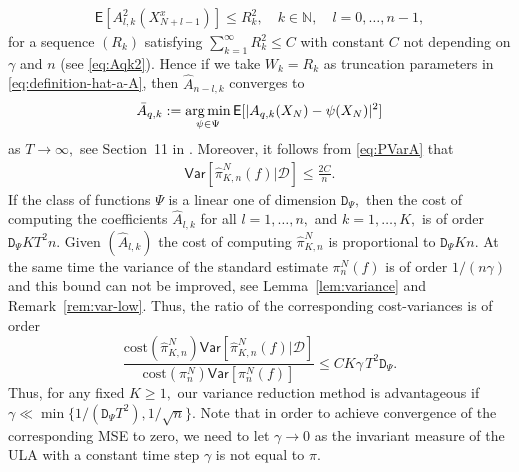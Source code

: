 \documentclass[bj]{imsart}
\def\PE{\mathsf{E}}
\def\PVar{\mathsf{Var}}
\def\nset{\mathbb{N}}
\def\TrainSet{\mathcal{D}}
\newcommand*{\argmin}{\operatornamewithlimits{arg\,min}}
\begin{document}
\begin{eqnarray*}
\PE[A^2_{l,k}(X^x_{N+l-1})]\leq R^2_k ,\quad k \in \nset, \quad l=0,\ldots,n-1,
\end{eqnarray*}
for a sequence  $(R_k)$ satisfying $\sum_{k=1}^\infty R^2_k\leq C$ with constant $C$  not depending  on $\gamma$ and $n$ (see \eqref{eq:Aqk2}).  Hence if we take $W_k=R_k$ as truncation parameters in \eqref{eq:definition-hat-a-A}, then $\widehat A_{n-l,k}$ converges to
\[
\bar A_{q,k}:=\argmin_{\psi\in\Psi}\mathsf{E}[|A_{q,k}(X_{N})-\psi(X_{N})|^2]
\]
 as $T\to \infty,$ see Section~11 in \cite{gyorfi2006distribution}.  Moreover, it follows from \eqref{eq:PVarA} that
\begin{eqnarray*}
\PVar[\widehat \pi_{K,n}^N(f)|\TrainSet]\leq \frac{2C}{n}.
\end{eqnarray*}
If the class of functions $\Psi$ is a linear one of dimension $\mathtt{D}_\Psi,$ then the cost of computing the coefficients $\widehat A_{l,k}$ for all $l=1,\ldots,n,$ and $k=1,\ldots,K,$ is of order  $ \mathtt{D}_\Psi K T^2 n$. Given $(\widehat A_{l,k})$ the cost of computing  $\widehat \pi_{K,n}^N$ is proportional to $\mathtt{D}_\Psi K n.$ At the same time the variance of the standard estimate $ \pi_{n}^N(f)$ is of order $1/(n\gamma)$ and this bound can not be improved, see Lemma~\ref{lem:variance} and Remark~\ref{rem:var-low}. Thus, the ratio of the corresponding cost-variances is of order
\begin{equation}
\label{eq:cost_theoretical}
\frac{\mathrm{cost}(\widehat \pi_{K,n}^N) \PVar[\widehat \pi_{K,n}^N(f)|\TrainSet]}{\mathrm{cost}(\pi_{n}^N)\PVar[\pi_{n}^N(f)]}\leq C  K \gamma \, T^2 \mathtt{D}_\Psi.
\end{equation}
Thus, for any fixed $K\geq 1,$  our variance reduction method is advantageous if $\gamma\ll\min\{1/(\mathtt{D}_\Psi T^2),1/\sqrt{n}\}.$  Note that in order to achieve convergence of the corresponding MSE to zero, we need to let $\gamma\to 0$ as the invariant measure of the ULA with a constant time step $\gamma$ is not equal to $\pi.$
\end{document}

